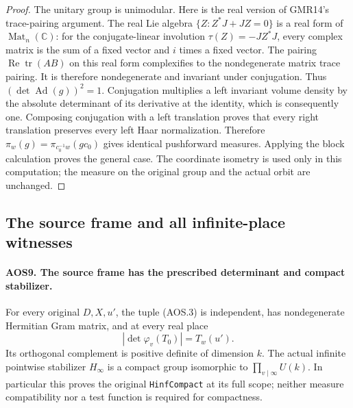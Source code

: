 \documentclass[11pt,a4paper]{article}
\numberwithin{equation}{section}
\theoremstyle{remark}\newtheorem{remark}[theorem]{Remark}
\begin{document}
\begin{proof}
The unitary group is unimodular.  Here is the real version of
GMR14's trace-pairing argument.  The real Lie algebra
$\{Z:Z^*J+JZ=0\}$ is a real form of
$\operatorname{Mat}_n(\mathbb C)$: for the conjugate-linear
involution $\tau(Z)=-JZ^*J$, every complex matrix is the sum of
a fixed vector and $i$ times a fixed vector.  The pairing
$\operatorname{Re}\operatorname{tr}(AB)$ on this real form
complexifies to the nondegenerate matrix trace pairing.  It is
therefore nondegenerate and invariant under conjugation.  Thus
$(\det\operatorname{Ad}(g))^2=1$.  Conjugation multiplies a
left invariant volume density by the absolute determinant of its
derivative at the identity, which is consequently one.  Composing
conjugation with a left translation proves that every right
translation preserves every left Haar normalization.  Therefore
$\pi_w(g)=\pi_{c_0^{-1}w}(gc_0)$ gives identical pushforward
measures.  Applying the block calculation proves the general case.
The coordinate isometry is used only in this computation; the
measure on the original group and the actual orbit are unchanged.
\end{proof}

\subsection{The source frame and all infinite-place witnesses}

\paragraph{AOS9. The source frame has the prescribed determinant and compact stabilizer.}
\label{claim:AOS9}
For every original $D,X,u'$, the tuple (AOS.3) is independent,
has nondegenerate Hermitian Gram matrix, and at every real place
\[
          |\det\varphi_v(T_0)|=T_w(u').
 \tag{AOS.23}
\]
Its orthogonal complement is positive definite of dimension $k$.
The actual infinite pointwise stabilizer $H_\infty$ is a compact
group isomorphic to $\prod_{v\mid\infty}U(k)$.  In particular this
proves the original \texttt{Hinf\allowbreak Compact} at its full scope; neither
measure compatibility nor a test function is required for compactness.
\end{document}
